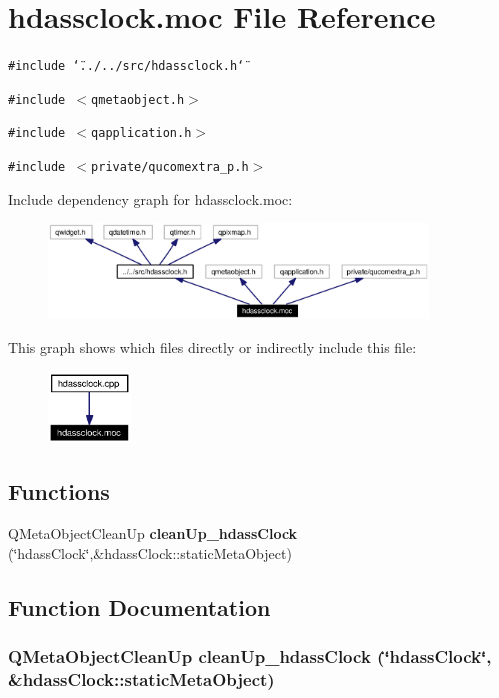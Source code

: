 \section{hdassclock.moc File Reference}
\label{hdassclock_8moc}


{\tt \#include \char`\"{}../../src/hdassclock.h\char`\"{}}\par
{\tt \#include $<$qmetaobject.h$>$}\par
{\tt \#include $<$qapplication.h$>$}\par
{\tt \#include $<$private/qucomextra\_\-p.h$>$}\par


Include dependency graph for hdassclock.moc:\begin{figure}[H]
\begin{center}
\leavevmode
\includegraphics[width=286pt]{hdassclock_8moc__incl}
\end{center}
\end{figure}


This graph shows which files directly or indirectly include this file:\begin{figure}[H]
\begin{center}
\leavevmode
\includegraphics[width=62pt]{hdassclock_8moc__dep__incl}
\end{center}
\end{figure}
\subsection*{Functions}
\begin{CompactItemize}
\item 
QMeta\-Object\-Clean\-Up {\bf clean\-Up\_\-hdass\-Clock} (\char`\"{}hdass\-Clock\char`\"{},\&hdass\-Clock::static\-Meta\-Object)
\end{CompactItemize}


\subsection{Function Documentation}
\subsubsection{\setlength{\rightskip}{0pt plus 5cm}QMeta\-Object\-Clean\-Up clean\-Up\_\-hdass\-Clock (\char`\"{}hdass\-Clock\char`\"{}, \&hdass\-Clock::static\-Meta\-Object)\hspace{0.3cm}{\tt  [static]}}\label{hdassclock_8moc_a0}


